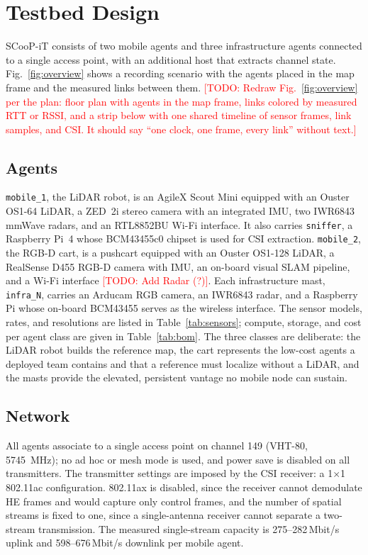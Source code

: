 \documentclass[journal]{IEEEtran}
\newcommand{\todo}[1]{\textcolor{red}{[TODO: #1]}}
\begin{document}
\section{Testbed Design}
\label{sec:design}
SCooP-iT consists of two mobile agents and three infrastructure
agents connected to a single access point, with an additional host
that extracts channel state. Fig.~\ref{fig:overview} shows a recording
scenario with the agents placed in the map frame and the measured
links between them. \todo{Redraw Fig.~\ref{fig:overview} per the plan:
floor plan with agents in the map frame, links colored by measured RTT
or RSSI, and a strip below with one shared timeline of sensor frames,
link samples, and CSI. It should say ``one clock, one frame, every
link'' without text.}



\subsection{Agents}
\texttt{mobile\_1}, the LiDAR robot, is an AgileX Scout Mini equipped
with an Ouster OS1-64 LiDAR, a ZED~2i stereo camera with an integrated IMU,
two IWR6843 mmWave radars, and an RTL8852BU Wi-Fi interface. It also
carries \texttt{sniffer}, a Raspberry Pi~4 whose BCM43455c0 chipset is
used for CSI extraction. \texttt{mobile\_2}, the RGB-D cart, is a
pushcart equipped with an Ouster OS1-128 LiDAR, a RealSense D455 RGB-D
camera with IMU, an on-board visual SLAM pipeline, and a Wi-Fi interface \todo{Add Radar
(?)}. Each infrastructure mast, \texttt{infra\_N}, carries an Arducam
RGB camera, an IWR6843 radar, and a Raspberry Pi whose on-board
BCM43455 serves as the wireless interface. The sensor models, rates,
and resolutions are listed in Table~\ref{tab:sensors}; compute,
storage, and cost per agent class are given in Table~\ref{tab:bom}.
The three classes are deliberate: the LiDAR robot builds the reference
map, the cart represents the low-cost agents a deployed team contains
and that a reference must localize without a LiDAR, and the masts
provide the elevated, persistent vantage no mobile node can sustain.







\subsection{Network}
All agents associate to a single access point on channel 149 (VHT-80,
\SI{5745}{\mega\hertz}); no ad hoc or mesh mode is used, and power
save is disabled on all transmitters. The transmitter settings are
imposed by the CSI receiver: a 1$\times$1 802.11ac configuration.
802.11ax is disabled, since the receiver cannot demodulate HE frames
and would capture only control frames, and the number of spatial
streams is fixed to one, since a single-antenna receiver cannot
separate a two-stream transmission. The measured single-stream
capacity is \numrange{275}{282}\,Mbit/s uplink and
\numrange{598}{676}\,Mbit/s downlink per mobile agent.
\end{document}

